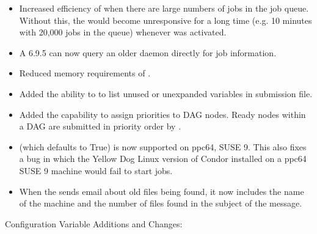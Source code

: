 \begin{itemize}
\item Increased efficiency of  when there are large
numbers of jobs in the job queue.  Without this, the 
would become unresponsive for a long time (e.g. 10 minutes with 20,000
jobs in the queue) whenever  was activated.

\item A 6.9.5  can now query an older  daemon directly 
for job information.

\item Reduced memory requirements of .

\item Added the ability to  to list unused or unexpanded 
  variables in submission file.

\item Added the capability to assign priorities to DAG nodes.  Ready nodes
within a DAG are submitted in priority order by .

\item {} (which defaults to
True) is now supported on ppc64, SUSE 9.  This also fixes a bug in which
the Yellow Dog Linux version of Condor installed on a ppc64 SUSE 9 machine
would fail to start jobs.

\item When the  sends email about old files being found, it
now includes the name of the machine and the number of files found in the
subject of the message.

\end{itemize}

\noindent Configuration Variable Additions and Changes:

